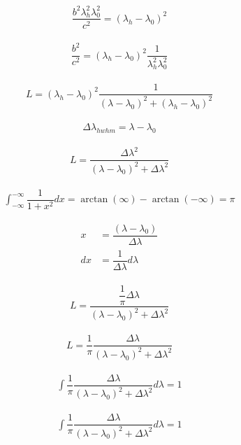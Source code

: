\begin{align}
	\dfrac{b^2 \lambda_h^2 \lambda_0^2}{c^2}
		= \left(\lambda_h - \lambda_0\right)^2
\end{align}

\begin{align}
	\dfrac{b^2}{c^2} = \left(\lambda_h - \lambda_0\right)^2 \dfrac{1}{\lambda_h^2 \lambda_0^2}
\end{align}

\begin{align}
	L = \left(\lambda_h - \lambda_0\right)^2 \dfrac{1}{\left(\lambda - \lambda_0\right)^2 + \left(\lambda_h - \lambda_0\right)^2}
\end{align}

\begin{align}
	\Delta \lambda_{hwhm} = \lambda - \lambda_0
\end{align}

\begin{align}
	L =   \dfrac{ \Delta \lambda^2}{\left(\lambda - \lambda_0\right)^2 + \Delta \lambda^2}
\end{align}

\begin{align}
   \int_{-\infty}^{-\infty} \dfrac{1}{1 + x^2} dx = \arctan(\infty) - \arctan(-\infty) = \pi
\end{align}


\begin{align}
	x &= \dfrac{\left(\lambda - \lambda_0\right)}{ \Delta \lambda} \\
	dx &= \dfrac{1}{\Delta \lambda} d\lambda
\end{align}

\begin{align}
	L =   \dfrac{\dfrac{1}{\pi} \Delta \lambda}{\left(\lambda - \lambda_0\right)^2 + \Delta \lambda^2}
\end{align}

\begin{align}
	L =  \dfrac{1}{\pi} \dfrac{\Delta \lambda}{\left(\lambda - \lambda_0\right)^2 + \Delta \lambda^2}
\end{align}

\begin{align}
	\int \dfrac{1}{\pi} \dfrac{\Delta \lambda}{\left(\lambda - \lambda_0\right)^2 + \Delta \lambda^2} d\lambda = 1
\end{align}

\begin{align}
	\int \dfrac{1}{\pi} \dfrac{\Delta \lambda}{\left(\lambda - \lambda_0\right)^2 + \Delta \lambda^2} d\lambda = 1
\end{align}
